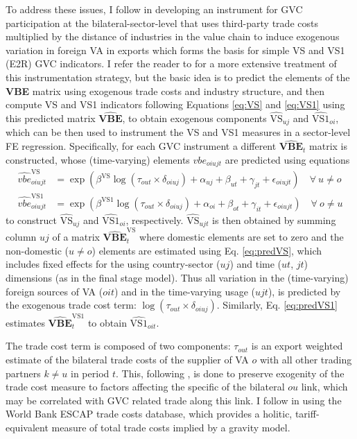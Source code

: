 \documentclass[a4paper]{article}
\begin{document}
To address these issues, I follow \citet{Kummritz20161} in developing an instrument for GVC participation at the bilateral-sector-level that uses third-party trade costs multiplied by the distance of industries in the value chain to induce exogenous variation in foreign VA in exports which forms the basis for simple VS and VS1 (E2R) GVC indicators. I refer the reader to \citet{Kummritz20161} for a more extensive treatment of this instrumentation strategy, but the basic idea is to predict the elements of the \textbf{VBE} matrix using exogenous trade costs and industry structure, and then compute VS and VS1 indicators following Equations \ref{eq:VS} and \ref{eq:VS1} using this predicted matrix $\hat{\textbf{VBE}}$, to obtain exogenous components $\hat{\text{VS}}_{uj}$ and $\hat{\text{VS1}}_{oi}$, which can be then used to instrument the VS and VS1 measures in a sector-level FE regression. Specifically, for each GVC instrument a different $\hat{\textbf{VBE}}_t$ matrix is constructed, whose (time-varying) elements $vbe_{oiujt}$ are predicted using equations
\begin{align} \label{eq:predVS}
\hat{vbe}_{oiujt}^\text{VS} &= \exp(\beta^\text{VS} \log(\tau_{out}\times \delta_{oiuj}) + \alpha_{uj} + \beta_{ut} +\gamma_{jt} + \epsilon_{oiujt}) \quad \forall\  u\neq o \\ \label{eq:predVS1}
\hat{vbe}_{oiujt}^\text{VS1} &= \exp(\beta^\text{VS1} \log(\tau_{out}\times \delta_{oiuj}) + \alpha_{oi} + \beta_{ot} +\gamma_{it} + \epsilon_{oiujt}) \quad \forall\  o\neq u
\end{align}
to construct $\hat{\text{VS}}_{uj}$ and $\hat{\text{VS1}}_{oi}$, respectively. $\hat{\text{VS}}_{ujt}$ is then obtained by summing column $uj$ of a matrix $\hat{\textbf{VBE}}_t^\text{VS}$ where domestic elements are set to zero and the non-domestic ($u\neq o$) elements are estimated using Eq. \ref{eq:predVS}, which includes fixed effects for the using country-sector ($uj$) and time ($ut$, $jt$) dimensions (as in the final stage model). Thus all variation in the (time-varying) foreign sources of VA ($oit$) and in the time-varying usage ($ujt$), is predicted by the exogenous trade cost term: $\log(\tau_{out}\times \delta_{oiuj})$. Similarly, Eq. \ref{eq:predVS1} estimates $\hat{\textbf{VBE}}_t^\text{VS1}$ to obtain $\hat{\text{VS1}}_{oit}$. \newline

The trade cost term is composed of two components: $\tau_{out}$ is an export weighted estimate of the bilateral trade costs of the supplier of VA $o$ with all other trading partners $k\neq u$ in period $t$. This, following \citet{Kummritz20161}, is done to preserve exogenity of the trade cost measure to factors affecting the specific of the bilateral $ou$ link, which may be correlated with GVC related trade along this link. I follow \citet{Kummritz20161} in using the World Bank ESCAP trade costs database, which provides a holitic, tariff-equivalent measure of total trade costs implied by a gravity model. \newline 
\end{document}
